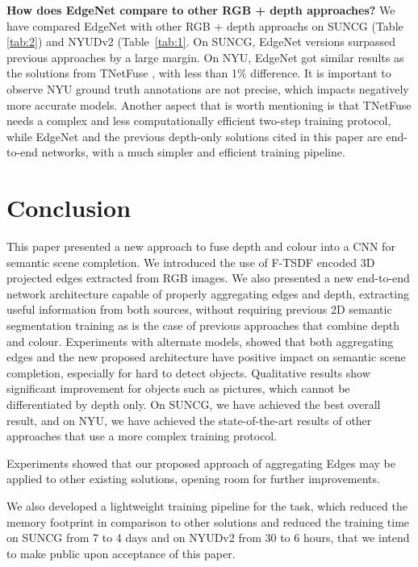 \textbf{How does EdgeNet compare to other RGB + depth approaches?} We have compared EdgeNet with other RGB + depth approachs on SUNCG (Table \ref{tab:2}) and NYUDv2 (Table~\ref{tab:1}. On SUNCG, EdgeNet versions surpassed previous approaches by a large margin. On NYU, EdgeNet got similar results as the solutions from  TNetFuse \cite{See_and_think_2018}, with less than 1\% difference. It is important to observe NYU ground truth annotations are not precise, which impacts negatively more accurate models. 
Another aspect that is worth mentioning is that TNetFuse needs a complex and less computationally efficient two-step training protocol, while EdgeNet and the previous depth-only solutions cited in this paper are end-to-end networks, with a much simpler and efficient training pipeline.

\section{Conclusion}
This paper presented a new approach to fuse depth and colour into a CNN for semantic scene completion. We introduced the use of F-TSDF encoded 3D projected edges extracted from RGB images. We also presented a new end-to-end network architecture capable of properly aggregating edges and depth, extracting useful information from both sources, without requiring previous 2D semantic segmentation training as is the case of previous approaches that combine depth and colour. Experiments with alternate models, showed that both aggregating edges and the new proposed architecture have positive impact on semantic scene completion, especially for hard to detect objects. Qualitative results show significant improvement for objects such as pictures, which cannot be differentiated by depth only. On SUNCG, we have achieved the best overall result, and on NYU, we  have achieved the state-of-the-art results of other approaches that use a more complex training protocol.

Experiments showed that our proposed approach of aggregating Edges may be applied to other existing solutions, opening room for further improvements. 

We also developed a lightweight training pipeline for the task, which reduced the memory footprint in comparison to other solutions and reduced the training time on SUNCG from 7 to 4 days and on NYUDv2 from 30 to 6 hours, that we intend to make public upon acceptance of this paper. 
